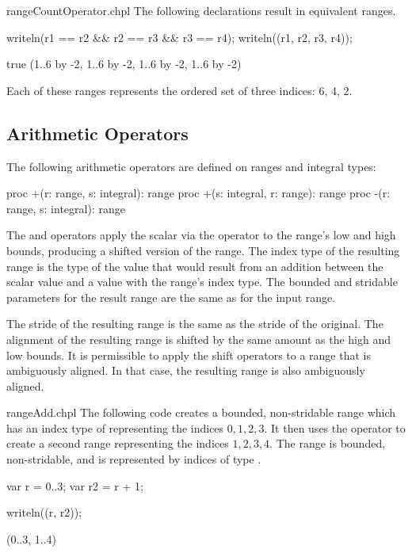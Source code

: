 \begin{chapelexample}{rangeCountOperator.chpl}
The following declarations result in equivalent ranges.
\begin{chapelpost}
writeln(r1 == r2 \&\& r2 == r3 \&\& r3 == r4);
writeln((r1, r2, r3, r4));
\end{chapelpost}
\begin{chapeloutput}
true
(1..6 by -2, 1..6 by -2, 1..6 by -2, 1..6 by -2)
\end{chapeloutput}
Each of these ranges represents the ordered set of three indices: 6, 4, 2.
\end{chapelexample}

\subsection{Arithmetic Operators}
\label{Range_Arithmetic}

The following arithmetic operators are defined on ranges and integral
types:

\begin{chapel}
proc +(r: range, s: integral): range
proc +(s: integral, r: range): range
proc -(r: range, s: integral): range
\end{chapel}

The \chpl{+} and \chpl{-} operators apply the scalar via the operator
to the range's low and high bounds, producing a shifted version of the
range.  The index type of the resulting range is the type of the value
that would result from an addition between the scalar value and a value
with the range's index type.  The bounded and stridable parameters for
the result range are the same as for the input range.

The stride of the resulting range is the same as the stride of the
original. The alignment of the resulting range is shifted by the same amount as
the high and low bounds.  It is permissible to apply the shift operators to a
range that is ambiguously aligned.  In that case, the resulting range is also
ambiguously aligned.

\begin{chapelexample}{rangeAdd.chpl}
The following code creates a bounded, non-stridable range 
which has an index type of  representing the indices ${0,
  1, 2, 3}$.  It then uses the \chpl{+} operator to
create a second range  representing the indices ${1, 2, 3,
  4}$.  The  range is bounded, non-stridable, and is represented by
indices of type .
\begin{chapel}
var r = 0..3;
var r2 = r + 1;
\end{chapel}
\begin{chapelpost}
writeln((r, r2));
\end{chapelpost}
\begin{chapeloutput}
(0..3, 1..4)
\end{chapeloutput}
\end{chapelexample}


